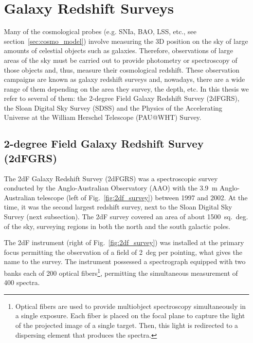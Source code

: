 \section{Galaxy Redshift Surveys}
\label{sec:surveys}
Many of the cosmological probes (e.g. SNIa, BAO, LSS, etc., see section~\ref{sec:cosmo_model}) involve measuring the 3D position on the sky of large amounts of celestial objects such as galaxies. Therefore, observations of large areas of the sky must be carried out to provide photometry or spectroscopy of those objects and, thus, measure their cosmological redshift. These observation campaigns are known as galaxy redshift surveys and, nowadays, there are a wide range of them depending on the area they survey, the depth, etc. In this thesis we refer to several of them: the 2-degree Field Galaxy Redshift Survey (2dFGRS), the Sloan Digital Sky Survey (SDSS) and the Physics of the Accelerating Universe at the William Herschel Telescope (PAU@WHT) Survey.

\subsection{2-degree Field Galaxy Redshift Survey (2dFGRS)}
\label{sec:2df}
The 2dF Galaxy Redshift Survey (2dFGRS) \citep{Colless2001} was a spectroscopic survey conducted by the Anglo-Australian Observatory (AAO) with the 3.9~m Anglo-Australian telescope (left of Fig.~\ref{fig:2df_survey}) between 1997 and 2002. At the time, it was the second largest redshift survey, next to the Sloan Digital Sky Survey (next subsection). The 2dF survey covered an area of about 1500~sq.~deg. of the sky, surveying regions in both the north and the south galactic poles.

The 2dF instrument (right of Fig.~\ref{fig:2df_survey}) was installed at the primary focus permitting the observation of a field of 2~deg per pointing, what gives the name to the survey. The instrument possessed a spectrograph equipped with two banks each of 200 optical fibers\footnote{Optical fibers are used to provide multiobject spectroscopy simultaneously in a single exposure. Each fiber is placed on the focal plane to capture the light of the projected image of a single target. Then, this light is redirected to a dispersing element that produces the spectra.}, permitting the simultaneous measurement of 400 spectra.

